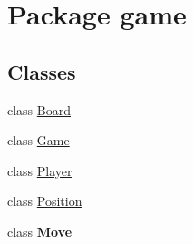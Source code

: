 \hypertarget{namespacegame}{\section{Package game}
\label{namespacegame}
}
\subsection*{Classes}
\begin{DoxyCompactItemize}
\item 
class \hyperlink{classgame_1_1_board}{Board}
\item 
class \hyperlink{classgame_1_1_game}{Game}
\item 
class \hyperlink{classgame_1_1_player}{Player}
\item 
class \hyperlink{classgame_1_1_position}{Position}
\item 
class {\bfseries Move}
\end{DoxyCompactItemize}
